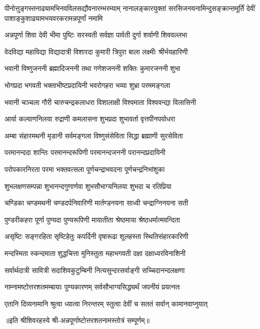 
{पीनोत्तुङ्गस्तनाढ्यामभिनवविलसद्यौवनारम्भरम्याम्}
{नानालङ्कारयुक्तां सरसिजनयनामिन्दुसङ्क्रान्तमूर्तिं}
{देवीं पाशाङ्कुशाढ्यामभयवरकरामन्नपूर्णां नमामि}


\twolineshloka
{अन्नपूर्णा शिवा देवी भीमा पुष्टिः सरस्वती}
{सर्वज्ञा पार्वती दुर्गा शर्वाणी शिववल्लभा}

\twolineshloka
{वेदविद्या महाविद्या विद्यादात्री विशारदा}
{कुमारी त्रिपुरा बाला लक्ष्मीः श्रीर्भयहारिणी}

\twolineshloka
{भवानी विष्णुजननी ब्रह्मादिजननी तथा}
{गणेशजननी शक्तिः कुमारजननी शुभा}

\twolineshloka
{भोगप्रदा भगवती भक्ताभीष्टप्रदायिनी}
{भवरोगहरा भव्या शुभ्रा परममङ्गला}

\twolineshloka
{भवानी चञ्चला गौरी चारुचन्द्रकलाधरा}
{विशालाक्षी विश्वमाता विश्ववन्द्या विलासिनी}

\twolineshloka
{आर्या कल्याणनिलया रुद्राणी कमलासना}
{शुभप्रदा शुभावर्ता वृत्तपीनपयोधरा}

\twolineshloka
{अम्बा संहारमथनी मृडानी सर्वमङ्गला}
{विष्णुसंसेविता सिद्धा ब्रह्माणी सुरसेविता}

\twolineshloka
{परमानन्ददा शान्तिः परमानन्दरूपिणी}
{परमानन्दजननी परानन्दप्रदायिनी}

\twolineshloka
{परोपकारनिरता परमा भक्तवत्सला}
{पूर्णचन्द्राभवदना पूर्णचन्द्रनिभांशुका}

\twolineshloka
{शुभलक्षणसम्पन्ना शुभानन्दगुणार्णवा}
{शुभसौभाग्यनिलया शुभदा च रतिप्रिया}

\twolineshloka
{चण्डिका चण्डमथनी चण्डदर्पनिवारिणी}
{मार्तण्डनयना साध्वी चन्द्राग्निनयना सती}

\twolineshloka
{पुण्डरीकहरा पूर्णा पुण्यदा पुण्यरूपिणी}
{मायातीता श्रेष्ठमाया श्रेष्ठधर्मात्मवन्दिता}

\twolineshloka
{असृष्टिः सङ्गरहिता सृष्टिहेतुः कपर्दिनी}
{वृषारूढा शूलहस्ता स्थितिसंहारकारिणी}

\twolineshloka
{मन्दस्मिता स्कन्दमाता शुद्धचित्ता मुनिस्तुता}
{महाभगवती दक्षा दक्षाध्वरविनाशिनी}

\twolineshloka
{सर्वार्थदात्री सावित्री सदाशिवकुटुम्बिनी}
{नित्यसुन्दरसर्वाङ्गी सच्चिदानन्दलक्षणा}

\twolineshloka
{नाम्नामष्टोत्तरशतमम्बायाः पुण्यकारणम्}
{सर्वसौभाग्यसिद्ध्यर्थं जपनीयं प्रयत्नतः}

\twolineshloka
{एतानि दिव्यनामानि श्रुत्वा ध्यात्वा निरन्तरम्}
{स्तुत्वा देवीं च सततं सर्वान् कामानवाप्नुयात्}

{॥इति श्रीशिवरहस्ये श्री-अन्नपूर्णाष्टोत्तरशतनामस्तोत्रं सम्पूर्णम्॥}
